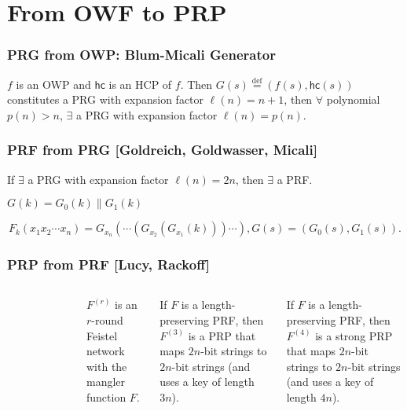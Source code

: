 \section{From OWF to PRP}
\begin{frame}\frametitle{PRG from OWP: Blum-Micali Generator}
\begin{theorem}
$f$ is an OWP and $\mathsf{hc}$ is an HCP of $f$. Then $G(s) \overset{\text{def}}{=} (f(s), \mathsf{hc}(s))$ constitutes a PRG with expansion factor $\ell(n) = n+1$, then $\forall$ polynomial $p(n) > n$, $\exists$ a PRG with expansion factor $\ell(n) = p(n)$.
\end{theorem}
\begin{figure}
\begin{center}

\end{center}
\end{figure}
\end{frame}
\begin{frame}\frametitle{PRF from PRG [Goldreich, Goldwasser, Micali]}
\begin{theorem}
If $\exists$ a PRG with expansion factor $\ell(n) = 2n$, then $\exists$ a PRF.
\end{theorem}
$G(k) = G_{0}(k)\| G_{1}(k)$
\begin{figure}
\begin{center}

\end{center}
\end{figure}
\[F_k(x_1x_2\cdots x_n) = G_{x_n}(\cdots(G_{x_2}(G_{x_1}(k)))\cdots), G(s)=(G_0(s),G_1(s)).\]
\end{frame}
\begin{frame}\frametitle{PRP from PRF [Lucy, Rackoff]}
\begin{columns}[c]
\begin{figure}
\begin{center}

\end{center}
\end{figure}
$F^{(r)}$ is an $r$-round Feistel network with the mangler function $F$.
\begin{theorem}
If $F$ is a length-preserving PRF, then $F^{(3)}$ is a PRP that maps $2n$-bit strings to $2n$-bit strings (and uses a key of length $3n$).
\end{theorem}
\begin{theorem}
If $F$ is a length-preserving PRF, then $F^{(4)}$ is a strong PRP that maps $2n$-bit strings to $2n$-bit strings (and uses a key of length $4n$).
\end{theorem}
\end{columns}
\end{frame}
